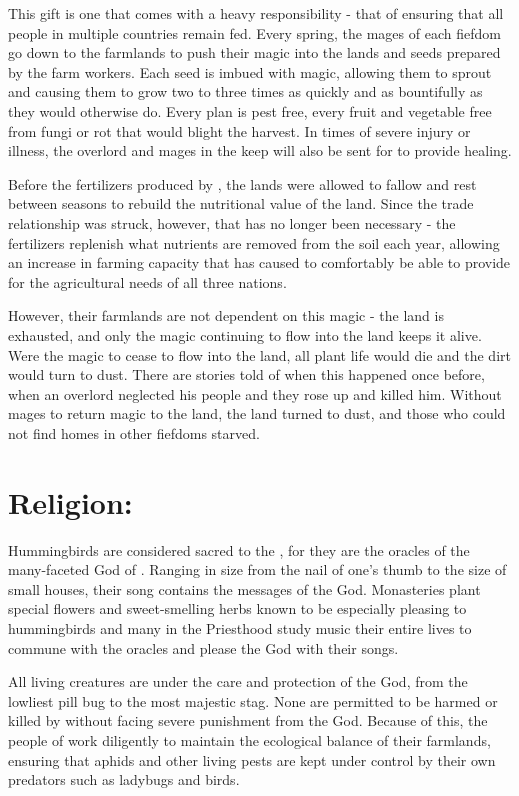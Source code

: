 \documentclass[blue]{GL2020}
\begin{document}
This gift is one that comes with a heavy responsibility - that of ensuring that all people in multiple countries remain fed.  Every spring, the mages of each fiefdom go down to the farmlands to push their magic into the lands and seeds prepared by the farm workers.  Each seed is imbued with magic, allowing them to sprout and causing them to grow two to three times as quickly and as bountifully as they would otherwise do.  Every plan is pest free, every fruit and vegetable free from fungi or rot that would blight the harvest.  In times of severe injury or illness, the overlord and mages in the keep will also be sent for to provide healing.   

Before the fertilizers produced by \pCreators{}, the lands were allowed to fallow and rest between seasons to rebuild the nutritional value of the land.  Since the trade relationship was struck, however, that has no longer been necessary - the fertilizers replenish what nutrients are removed from the soil each year, allowing an increase in farming capacity that has caused \pSun{} to comfortably be able to provide for the agricultural needs of all three nations.

However, their farmlands are not dependent on this magic - the land is exhausted, and only the magic continuing to flow into the land keeps it alive.  Were the magic to cease to flow into the land, all plant life would die and the dirt would turn to dust.  There are stories told of when this happened once before, when an overlord neglected his people and they rose up and killed him.  Without mages to return magic to the land, the land turned to dust, and those who could not find homes in other fiefdoms starved.
 
\section*{Religion:}

Hummingbirds are considered sacred to the \pSunCh{}, for they are the oracles of the many-faceted God of \pSun{}.  Ranging in size from the nail of one's thumb to the size of small houses, their song contains the messages of the God.  Monasteries plant special flowers and sweet-smelling herbs known to be especially pleasing to hummingbirds and many in the Priesthood study music their entire lives to commune with the oracles and please the God with their songs.

All living creatures are under the care and protection of the God, from the lowliest pill bug to the most majestic stag.  None are permitted to be harmed or killed by \pSunCh{} without facing severe punishment from the God.  Because of this, the people of \pSunCh{} work diligently to maintain the ecological balance of their farmlands, ensuring that aphids and other living pests are kept under control by their own predators such as ladybugs and birds.  
\end{document}
